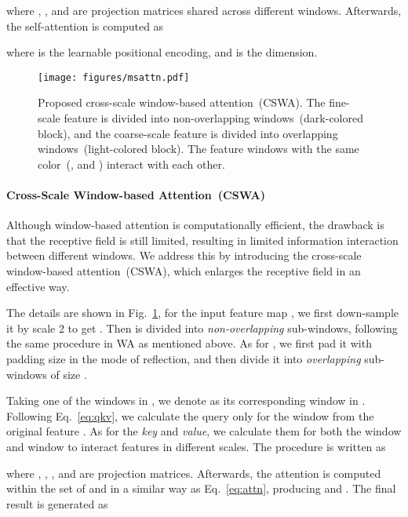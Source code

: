 \documentclass[10pt,twocolumn,letterpaper]{article}
\begin{document}
	where , , and  are projection matrices shared across different windows. Afterwards, the self-attention is computed as
	
	where  is the learnable positional encoding, and  is the  dimension.
	
	\begin{figure}[t]
		\begin{center}
\texttt{[image: figures/msattn.pdf]}
		\end{center}
		\vspace{-0.1in}
		\caption{Proposed cross-scale window-based attention~(CSWA). The fine-scale feature  is divided into non-overlapping windows~(dark-colored block), and the coarse-scale feature  is divided into overlapping windows~(light-colored block). The feature windows with the same color~(\eg,  and ) interact with each other.}
		\label{fig:msattn}
		\vspace{-0.1in}
	\end{figure}
	
	\paragraph{Cross-Scale Window-based Attention~(CSWA)}
	Although window-based attention is computationally efficient, the drawback is that the receptive field is still limited, resulting in limited information interaction between different windows. We address this by introducing the cross-scale window-based attention~(CSWA), which enlarges the receptive field in an effective way. 
	
	The details are shown in Fig.~\ref{fig:msattn}, for the input feature map , we first down-sample it by scale 2 to get . Then  is divided into  \textit{non-overlapping} sub-windows, following the same procedure in WA as mentioned above. As for , we first pad it with padding size  in the mode of reflection, and then divide it into \textit{overlapping} sub-windows of size . 
	
	Taking one of the windows  in , we denote  as its corresponding window in . Following Eq.~\eqref{eq:qkv}, we calculate the query  only for the window  from the original feature . As for the \textit{key} and \textit{value}, we calculate them for both the window  and window  to interact features in different scales. The procedure is written as
	
	where , , ,  and  are projection matrices. Afterwards, the attention is computed within the set of  and  in a similar way as Eq.~\eqref{eq:attn}, producing  and . The final result is generated as
	
\end{document}
